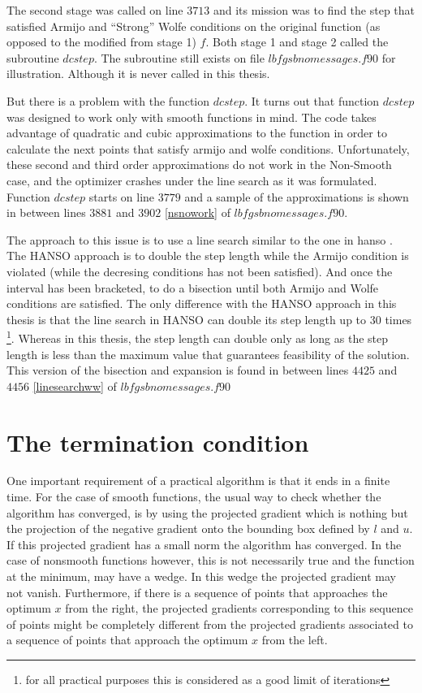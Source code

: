 The second stage was called on line $3713$ and its mission was to find the step that satisfied Armijo and ``Strong'' Wolfe conditions on the original function (as opposed to the modified from stage 1) $f$. Both stage 1 and stage 2 called the subroutine $dcstep$. The subroutine still exists on file $lbfgsbnomessages.f90$ for illustration. Although it is never called in this thesis.

But there is a problem with the function $dcstep$. It turns out that function $dcstep$ was designed to work only with smooth functions in mind. The code takes advantage of quadratic and cubic approximations to the function in order to calculate the next points that satisfy armijo and wolfe conditions. Unfortunately, these second and third order approximations do not work in the Non-Smooth case, and the optimizer crashes under the line search as it was formulated. Function $dcstep$ starts on line $3779$ and a sample of the approximations is shown in between lines $3881$ and $3902$ \ref{nsnowork} of $lbfgsbnomessages.f90$.

The approach to this issue is to use a line search similar to the one in hanso \citep{hanso}. The HANSO approach is to double the step length while the Armijo condition is violated (while the decresing conditions has not been satisfied). And once the interval has been bracketed, to do a bisection until both Armijo and Wolfe conditions are satisfied. The only difference with the HANSO approach in this thesis is that the line search in HANSO can double its step length up to $30$ times \footnote{for all practical purposes this is considered as a good limit of iterations}. Whereas in this thesis, the step length can double only as long as the step length is less than the maximum value that guarantees feasibility of the solution. This version of the bisection and expansion is found in between lines $4425$ and $4456$ \ref{linesearchww} of $lbfgsbnomessages.f90$


\section{The termination condition}

One important requirement of a practical algorithm is that it ends in a finite time. For the case of smooth functions, the usual way to check whether the algorithm has converged, is by using the projected gradient which is nothing but the projection of the negative gradient onto the bounding box defined by $l$ and $u$. If this projected gradient has a small norm the algorithm has converged. In the case of nonsmooth functions however, this is not necessarily true and the function at the minimum, may have a wedge. In this wedge the projected gradient may not vanish. Furthermore, if there is a sequence of points that approaches the optimum $x$ from the right, the projected gradients corresponding to this sequence of points might be completely different from the projected gradients associated to a sequence of points that approach the optimum $x$ from the left.

